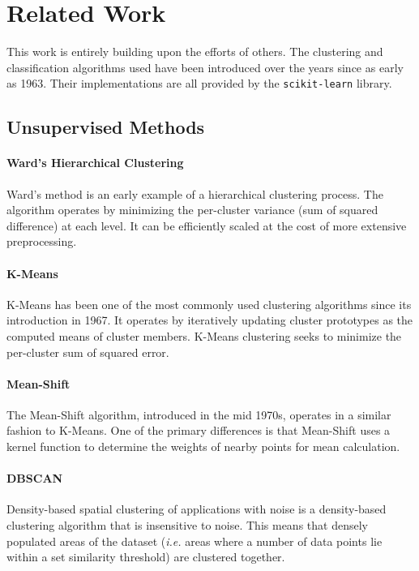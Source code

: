\documentclass[letterpaper,10pt]{article}
\begin{document}
\section{Related Work}

This work is entirely building upon the efforts of others. The clustering
and classification algorithms used have been introduced over the years
since as early as 1963. Their implementations are all provided by the
\texttt{scikit-learn}\cite{scikit-learn} library.

\subsection{Unsupervised Methods}

\paragraph{Ward's Hierarchical Clustering} Ward's method\cite{ward1963} is
an early example of a hierarchical clustering process. The algorithm
operates by minimizing the per-cluster variance (sum of squared difference)
at each level. It can be efficiently scaled at the cost of more extensive
preprocessing.

\paragraph{K-Means} K-Means\cite{macqueen1967} has been one of the most
commonly used clustering algorithms since its introduction in 1967. It
operates by iteratively updating cluster prototypes as the computed means
of cluster members. K-Means clustering seeks to minimize the per-cluster
sum of squared error.

\paragraph{Mean-Shift} The Mean-Shift\cite{fukunaga1975} algorithm,
introduced in the mid 1970s, operates in a similar fashion to K-Means. One
of the primary differences is that Mean-Shift uses a kernel function to
determine the weights of nearby points for mean calculation.

\paragraph{DBSCAN} Density-based spatial clustering of applications with
noise\cite{ester1996} is a density-based clustering algorithm that is
insensitive to noise. This means that densely populated areas of the
dataset (\textit{i.e.} areas where a number of data points lie within a set
similarity threshold) are clustered together.
\end{document}
